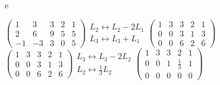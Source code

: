 \documentclass[12pt]{article}
\begin{document}
\begin{enumerate}
		e
		\begin{center}
			$\begin{pmatrix}
				1 & 3 & 3 & 2 & 1 \\ 2 & 6 & 9 & 5 & 5 \\ -1 & -3 & 3 & 0 & 5
			\end{pmatrix}
			\begin{matrix}
				L_2 \leftrightarrow L_2 - 2L_1 \\
				L_3 \leftrightarrow L_3 + L_1
			\end{matrix}	
			\begin{pmatrix}
				1 & 3 & 3 & 2 & 1 \\ 0 & 0 & 3 & 1 & 3 \\ 0 & 0 & 6 & 2 & 6
			\end{pmatrix}				
			$\\[10pt]
			$\begin{pmatrix}
				1 & 3 & 3 & 2 & 1 \\ 0 & 0 & 3 & 1 & 3 \\ 0 & 0 & 6 & 2 & 6
			\end{pmatrix}
			\begin{matrix}
				L_3 \leftrightarrow L_3 - 2L_2\\
				L_2 \leftrightarrow \frac{1}{3} L_2
			\end{matrix}
			\begin{pmatrix}
				1 & 3 & 3 & 2 & 1 \\ 0 & 0 & 1 & \frac{1}{3} & 1 \\ 0 & 0 & 0 & 0 & 0
			\end{pmatrix}
			$
		\end{center}
		

\end{enumerate}
\end{document}

